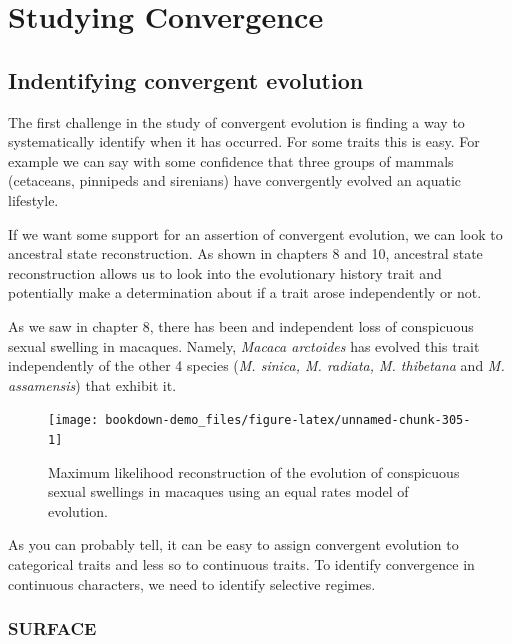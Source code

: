 \documentclass[
]{book}
\begin{document}
\hypertarget{convergence}{%
\chapter{Studying Convergence}\label{convergence}}

\hypertarget{indentifying-convergent-evolution}{%
\section{Indentifying convergent evolution}\label{indentifying-convergent-evolution}}

The first challenge in the study of convergent evolution is finding a way to systematically identify when it has occurred. For some traits this is easy. For example we can say with some confidence that three groups of mammals (cetaceans, pinnipeds and sirenians) have convergently evolved an aquatic lifestyle.

If we want some support for an assertion of convergent evolution, we can look to ancestral state reconstruction. As shown in chapters 8 and 10, ancestral state reconstruction allows us to look into the evolutionary history trait and potentially make a determination about if a trait arose independently or not.

As we saw in chapter 8, there has been and independent loss of conspicuous sexual swelling in macaques. Namely, \emph{Macaca arctoides} has evolved this trait independently of the other 4 species (\emph{M. sinica, M. radiata, M. thibetana} and \emph{M. assamensis}) that exhibit it.

\begin{figure}[H]

{\centering \texttt{[image: bookdown-demo\_files/figure-latex/unnamed-chunk-305-1]} 

}

\caption{Maximum likelihood reconstruction of the evolution of conspicuous sexual swellings in macaques using an equal rates model of evolution.}\label{fig:unnamed-chunk-305}
\end{figure}

As you can probably tell, it can be easy to assign convergent evolution to categorical traits and less so to continuous traits. To identify convergence in continuous characters, we need to identify selective regimes.

\hypertarget{surface}{%
\subsection{SURFACE}\label{surface}}
\end{document}
